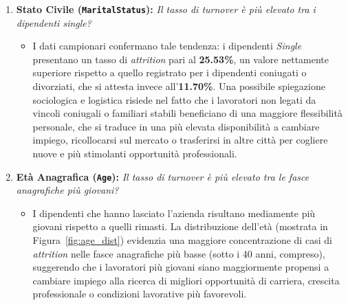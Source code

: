 \documentclass[11pt,a4paper]{article}
\begin{document}
\begin{enumerate}
    
    \item[\textbf{H3.}] \textbf{Stato Civile (\texttt{MaritalStatus}):} \textit{Il tasso di turnover è più elevato tra i dipendenti single?}
    \begin{itemize}
        \item[] I dati campionari confermano tale tendenza: i dipendenti \textit{Single} presentano un tasso di \textit{attrition} pari al \textbf{25.53\%}, un valore nettamente superiore rispetto a quello registrato per i dipendenti coniugati o divorziati, che si attesta invece all'\textbf{11.70\%}. Una possibile spiegazione sociologica e logistica risiede nel fatto che i lavoratori non legati da vincoli coniugali o familiari stabili beneficiano di una maggiore flessibilità personale, che si traduce in una più elevata disponibilità a cambiare impiego, ricollocarsi sul mercato o trasferirsi in altre città per cogliere nuove e più stimolanti opportunità professionali.
    \end{itemize}


 \item[\textbf{H4.}] \textbf{Età Anagrafica (\texttt{Age}):} \textit{Il tasso di turnover è più elevato tra le fasce anagrafiche più giovani?}
    \begin{itemize}
        \item[] I dipendenti che hanno lasciato l'azienda risultano mediamente più giovani rispetto a quelli rimasti. La distribuzione dell'età (mostrata in Figura~\ref{fig:age_dist}) evidenzia una maggiore concentrazione di casi di \textit{attrition} nelle fasce anagrafiche più basse (sotto i 40 anni, compreso), suggerendo che i lavoratori più giovani siano maggiormente propensi a cambiare impiego alla ricerca di migliori opportunità di carriera, crescita professionale o condizioni lavorative più favorevoli.
    \end{itemize}


\end{enumerate}
\end{document}
